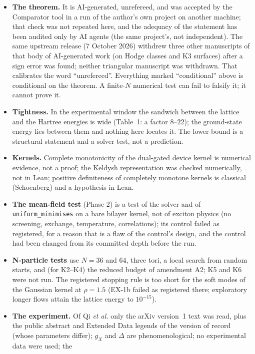 \documentclass[11pt,a4paper]{article}
\begin{document}
\begin{itemize}[nosep]
\item \textbf{The theorem.} It is AI-generated, unrefereed, and was accepted by the Comparator tool in a run of the author's own project on
another machine; that check was not repeated here, and the adequacy of the statement has been audited only by AI agents (the same
project's, not independent). The same upstream release (7 October 2026) withdrew three other manuscripts of that body of
AI-generated work (on Hodge classes and K3 surfaces) after a sign error was found; neither triangular manuscript was withdrawn.
That calibrates the word ``unrefereed''. Everything marked ``conditional'' above is conditional on
the theorem. A finite-$N$ numerical test can fail to falsify it; it cannot prove it.
\item \textbf{Tightness.} In the experimental window the sandwich between the lattice and the Hartree energies is wide (Table~1: a
factor $8$--$22$); the ground-state energy lies between them and nothing here locates it. The lower bound is a structural statement and
a solver test, not a prediction.
\item \textbf{Kernels.} Complete monotonicity of the dual-gated device kernel is numerical evidence, not a proof; the Keldysh
representation was checked numerically, not in Lean; positive definiteness of completely monotone kernels is classical
(Schoenberg) and a hypothesis in Lean.
\item \textbf{The mean-field test} (Phase 2) is a test of the solver and of \texttt{uniform\_minimises} on a bare bilayer kernel,
not of exciton physics (no screening, exchange, temperature, correlations); its control failed as registered, for a reason that
is a flaw of the control's design, and the control had been changed from its committed depth before the run.
\item \textbf{N-particle tests} use $N=36$ and $64$, three tori, a local search from random starts, and (for K2--K4) the reduced
budget of amendment A2; K5 and K6 were not run. The registered stopping rule is too short for the soft modes of the Gaussian
kernel at $\rho=1.5$ (EX-1b failed as registered there; exploratory longer flows attain the lattice energy to $10^{-15}$).
\item \textbf{The experiment.} Of Qi \emph{et al.} only the arXiv version~1 text was read, plus the public abstract and Extended Data legends
of the version of record (whose parameters differ); $g_X$ and $\Delta$ are phenomenological; no experimental data were used; the

\end{itemize}
\end{document}
